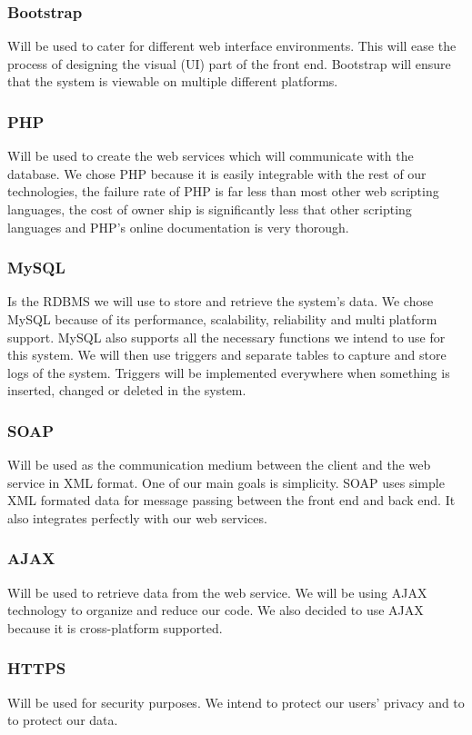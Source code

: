 \documentclass[11pt]{article}
\begin{document}
	\subsubsection{Bootstrap}
	Will be used to cater for different web interface environments. This will ease the process of designing the visual (UI) part of the front end. Bootstrap will ensure that the system is viewable on multiple different platforms.
	\subsubsection{PHP}
	Will be used to create the web services which will communicate with the database. We chose PHP because it is easily integrable with the rest of our technologies, the failure rate of PHP is far less than most other web scripting languages, the cost of owner ship is significantly less that other scripting languages and PHP's online documentation is very thorough.
	\subsubsection{MySQL}
	Is the RDBMS we will use to store and retrieve the system's data. We chose MySQL because of its performance, scalability, reliability and multi platform support. MySQL also supports all the necessary functions we intend to use for this system. We will then use triggers and separate tables to capture and store logs of the system. Triggers will be implemented everywhere when something is inserted, changed or deleted in the system.
	\subsubsection{SOAP}
	Will be used as the communication medium between the client and the web service in XML format. One of our main goals is simplicity. SOAP uses simple XML formated data for message passing between the front end and back end. It also integrates perfectly with our web services.
	\subsubsection{AJAX}
	Will be used to retrieve data from the web service. We will be using AJAX technology to organize and reduce our code. We also decided to use AJAX because it is cross-platform supported.
	\subsubsection{HTTPS}
	Will be used for security purposes. We intend to protect our users' privacy and to to protect our data.
	\newpage
	
\end{document}
